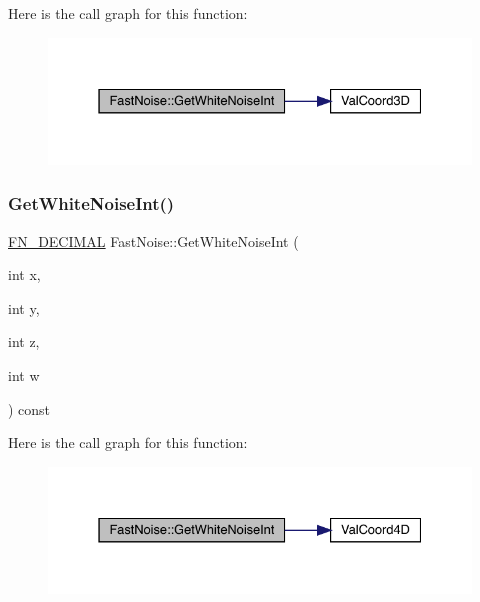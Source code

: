 Here is the call graph for this function\+:
\nopagebreak
\begin{figure}[H]
\begin{center}
\leavevmode
\includegraphics[width=331pt]{class_fast_noise_a1c0a782e7675a58f6fe777eb6fa06eaf_cgraph}
\end{center}
\end{figure}
\mbox{\label{class_fast_noise_aa2e897b4faa4687260314dc1572301ec}} 
\subsubsection{\texorpdfstring{Get\+White\+Noise\+Int()}{GetWhiteNoiseInt()}\hspace{0.1cm}{\footnotesize\ttfamily [3/3]}}
{\footnotesize\ttfamily \mbox{\hyperlink{_fast_noise_8h_a75a9ef6d2541c4921815b885bfd449c3}{F\+N\+\_\+\+D\+E\+C\+I\+M\+AL}} Fast\+Noise\+::\+Get\+White\+Noise\+Int (\begin{DoxyParamCaption}\item[{int}]{x,  }\item[{int}]{y,  }\item[{int}]{z,  }\item[{int}]{w }\end{DoxyParamCaption}) const}

Here is the call graph for this function\+:
\nopagebreak
\begin{figure}[H]
\begin{center}
\leavevmode
\includegraphics[width=331pt]{class_fast_noise_aa2e897b4faa4687260314dc1572301ec_cgraph}
\end{center}
\end{figure}
\mbox{\label{class_fast_noise_ad264b1bd7c819f7d5d9b5d5695a140a8}} 
